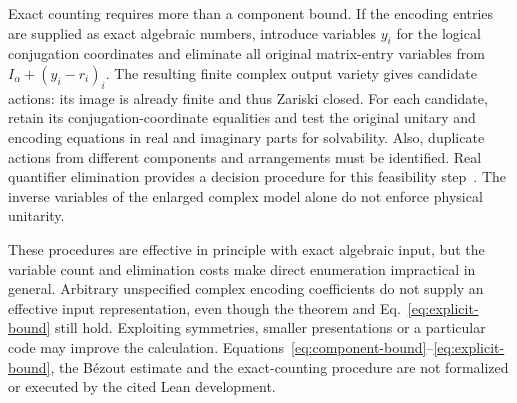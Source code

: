 \documentclass[aps,prl,reprint,notitlepage,nofootinbib,nobibnotes]{revtex4-2}
\begin{document}
Exact counting requires more than a component bound. If the encoding
entries are supplied as exact algebraic numbers, introduce variables
\(y_i\) for the logical conjugation coordinates and eliminate all original
matrix-entry variables from \(I_\alpha+(y_i-r_i)_i\).
The resulting finite complex output variety gives candidate actions:
its image is already finite and thus Zariski closed.
For each candidate, retain its conjugation-coordinate equalities and
test the original unitary and encoding equations in real and imaginary
parts for solvability. Also,
duplicate actions from different components and arrangements must be
identified. Real quantifier elimination provides a decision procedure
for this feasibility step~\cite{BasuPollackRoy}. The inverse variables
of the enlarged complex model alone do not enforce physical unitarity.

These procedures are effective in principle with exact algebraic
input, but the variable count and elimination costs make direct
enumeration impractical in general. Arbitrary unspecified complex
encoding coefficients do not supply an effective input representation,
even though the theorem and Eq.~\eqref{eq:explicit-bound} still hold.
Exploiting symmetries, smaller presentations or a particular code may
improve the calculation. Equations~\eqref{eq:component-bound}--\eqref{eq:explicit-bound},
the B\'ezout estimate and the exact-counting procedure are not
formalized or executed by the cited Lean development.
\end{document}
